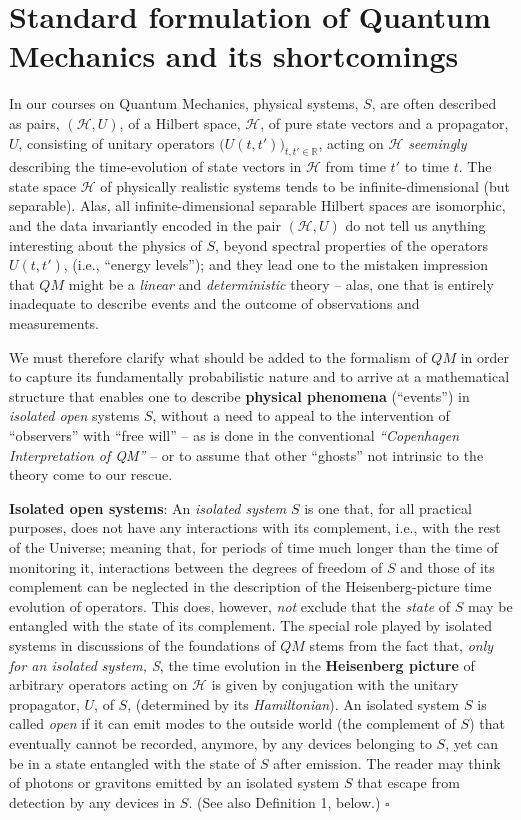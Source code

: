 \documentclass[12pt]{article}
\begin{document}
\section{Standard formulation of Quantum Mechanics and its shortcomings}
In our courses on Quantum Mechanics, physical systems, $S$, are often described as pairs, $(\mathcal{H}, U)$, of a Hilbert space, $\mathcal{H}$, of pure state vectors and a propagator, $U$, consisting of unitary operators 
$\big(U(t,t')\big)_{t,t' \in \mathbb{R}}$, acting on $\mathcal{H}$ \textit{seemingly} describing the time-evolution of state vectors in $\mathcal{H}$ from time $t'$ to time $t$. The state space $\mathcal{H}$ of physically realistic systems tends to be infinite-dimensional (but separable). Alas, all infinite-dimensional separable Hilbert spaces are isomorphic, and the data invariantly encoded in the pair $(\mathcal{H}, U)$ do not tell us anything interesting about the physics of $S$, beyond spectral properties of the operators $U(t,t')$, (i.e., ``energy levels''); and they lead one to the mistaken impression that $QM$ might be a \textit{linear} and \textit{deterministic} theory -- alas, one that is entirely inadequate to describe events and the outcome of observations and measurements.

We must therefore clarify what should be added to the formalism of $QM$ in order to capture its fundamentally probabilistic nature and to arrive at a mathematical structure that enables one to describe {\bf{physical phenomena}} (``events'') in  \textit{isolated open} systems $S$, without a need to appeal to the intervention of ``observers'' with ``free will'' -- as is done in the conventional \textit{``Copenhagen Interpretation of QM''} -- or to assume that other ``ghosts'' not intrinsic to the theory come to our rescue.

{\bf{Isolated open systems}}: An \textit{isolated system} $S$ is one that, for all practical purposes, does not have any interactions with its complement, i.e., with the rest of the Universe; meaning that, for periods of time much longer than the time of monitoring it, interactions between the degrees of freedom of $S$ and those of its complement can be neglected in the description of the Heisenberg-picture time evolution of operators. This does, however, \textit{not} exclude that the \textit{state} of $S$ may be entangled with the state of its complement. The special role played by isolated systems in discussions of the foundations of $QM$ stems from the fact that, \textit{only for an isolated system, S}, the time evolution in the {\bf{Heisenberg picture}} of arbitrary operators acting on $\mathcal{H}$ is given by conjugation with the unitary propagator, $U$, of $S$, (determined by its \textit{Hamiltonian}).
An isolated system $S$ is called \textit{open} if it can emit modes to the outside world (the complement of $S$) that eventually cannot be recorded, anymore, by any devices belonging to $S$, yet can be in a state entangled with the state of $S$ after emission. The reader may think of photons or gravitons emitted by an isolated system $S$ that escape from detection by any devices in $S$. (See also Definition 1, below.)\hspace{1cm} $\square$
 
\end{document}
